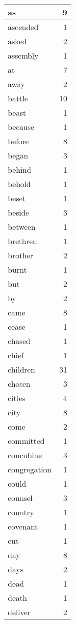 \begin{center}
\begin{longtable}{l|r}
as & 9 \\ \hline
ascended & 1 \\ \hline
asked & 2 \\ \hline
assembly & 1 \\ \hline
at & 7 \\ \hline
away & 2 \\ \hline
battle & 10 \\ \hline
beast & 1 \\ \hline
because & 1 \\ \hline
before & 8 \\ \hline
began & 3 \\ \hline
behind & 1 \\ \hline
behold & 1 \\ \hline
beset & 1 \\ \hline
beside & 3 \\ \hline
between & 1 \\ \hline
brethren & 1 \\ \hline
brother & 2 \\ \hline
burnt & 1 \\ \hline
but & 2 \\ \hline
by & 2 \\ \hline
came & 8 \\ \hline
cease & 1 \\ \hline
chased & 1 \\ \hline
chief & 1 \\ \hline
children & 31 \\ \hline
chosen & 3 \\ \hline
cities & 4 \\ \hline
city & 8 \\ \hline
come & 2 \\ \hline
committed & 1 \\ \hline
concubine & 3 \\ \hline
congregation & 1 \\ \hline
could & 1 \\ \hline
counsel & 3 \\ \hline
country & 1 \\ \hline
covenant & 1 \\ \hline
cut & 1 \\ \hline
day & 8 \\ \hline
days & 2 \\ \hline
dead & 1 \\ \hline
death & 1 \\ \hline
deliver & 2 \\ \hline

\end{longtable}
\end{center}
